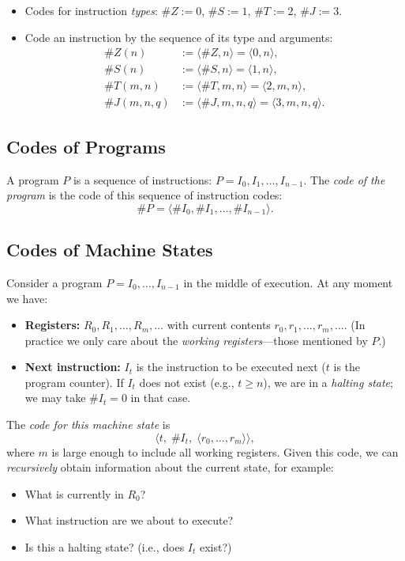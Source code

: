 \documentclass[11pt]{article}
\begin{document}
\begin{itemize}[leftmargin=1.6em]
    \item Codes for instruction \emph{types}: $\#Z := 0$, $\#S := 1$, $\#T := 2$, $\#J := 3$.
    \item Code an instruction by the sequence of its type and arguments:
    \begin{align*}
        \#Z(n) &:= \langle \#Z, n \rangle = \langle 0, n \rangle, \\
        \#S(n) &:= \langle \#S, n \rangle = \langle 1, n \rangle, \\
        \#T(m, n) &:= \langle \#T, m, n \rangle = \langle 2, m, n \rangle, \\
        \#J(m, n, q) &:= \langle \#J, m, n, q \rangle = \langle 3, m, n, q \rangle.
    \end{align*}
\end{itemize}

\subsection{Codes of Programs}

A program $P$ is a sequence of instructions: $P = I_0, I_1, \dots, I_{n-1}$. The \emph{code of the program} is the code of this sequence of instruction codes:
\[
    \#P = \langle \#I_0, \#I_1, \dots, \#I_{n-1} \rangle.
\]

\subsection{Codes of Machine States}

Consider a program $P = I_0, \dots, I_{n-1}$ in the middle of execution. At any moment we have:
\begin{itemize}[leftmargin=1.6em]
    \item \textbf{Registers:} $R_0, R_1, \dots, R_m, \dots$ with current contents $r_0, r_1, \dots, r_m, \dots$. (In practice we only care about the \emph{working registers}---those mentioned by $P$.)
    \item \textbf{Next instruction:} $I_t$ is the instruction to be executed next ($t$ is the program counter). If $I_t$ does not exist (e.g., $t \ge n$), we are in a \emph{halting state}; we may take $\#I_t = 0$ in that case.
\end{itemize}

The \emph{code for this machine state} is
\[
    \langle t,\; \#I_t,\; \langle r_0, \dots, r_m \rangle \rangle,
\]
where $m$ is large enough to include all working registers. Given this code, we can \emph{recursively} obtain information about the current state, for example:
\begin{itemize}[leftmargin=1.6em]
    \item What is currently in $R_0$?
    \item What instruction are we about to execute?
    \item Is this a halting state? (i.e., does $I_t$ exist?)
\end{itemize}
\end{document}

